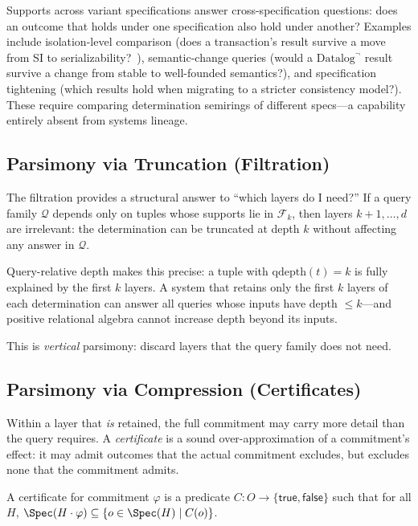 Supports across variant specifications answer cross-specification
questions: does an outcome that holds under one specification also hold
under another?
Examples include isolation-level comparison (does a transaction's result
survive a move from SI to
serializability?~\cite{vandevoort2025mixed}), semantic-change queries
(would a $\mbox{Datalog}^\neg$ result survive a change from stable to well-founded
semantics?), and specification tightening (which results hold
when migrating to a stricter consistency model?).
These require comparing determination semirings of different
specs---a capability entirely absent from systems lineage.

\subsection{Parsimony via Truncation (Filtration)}
\label{sec:parsimony-truncation}

The filtration provides a structural answer to ``which layers do I need?''
If a query family $\mathcal{Q}$ depends only on tuples whose supports
lie in $\mathcal{F}_k$, then layers $k{+}1, \ldots, d$ are irrelevant:
the determination can be truncated at depth $k$ without affecting any
answer in $\mathcal{Q}$.

Query-relative depth makes this precise: a tuple with
$\mathrm{qdepth}(t) = k$ is fully explained by the first $k$ layers.
A system that retains only the first $k$ layers of each determination
can answer all queries whose inputs have depth $\le k$---and positive
relational algebra cannot increase depth beyond its inputs.

This is \emph{vertical} parsimony: discard layers that the query family
does not need.

\subsection{Parsimony via Compression (Certificates)}
\label{sec:parsimony-compression}

Within a layer that \emph{is} retained, the full commitment may carry
more detail than the query requires.
A \emph{certificate} is a sound over-approximation of a commitment's
effect: it may admit outcomes that the actual commitment excludes, but
excludes none that the commitment admits.

\begin{definition}[Certificate]
  A certificate for commitment $\varphi$ is a predicate
  $C : O \to \{\mathsf{true}, \mathsf{false}\}$ such that for all $H$,
  $\Spec(H \cdot \varphi) \subseteq \{o \in \Spec(H) \mid C(o)\}$.
\end{definition}

